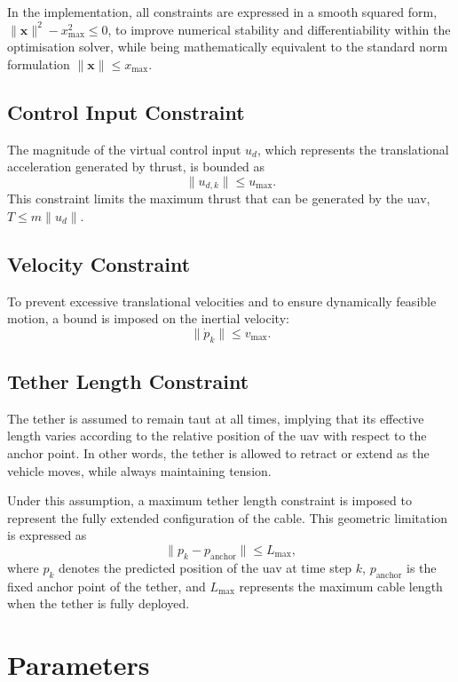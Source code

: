 In the implementation, all constraints are expressed in a smooth squared form, \(\|\mathbf{x}\|^2 - x_{\max}^2 \leq 0\), 
to improve numerical stability and differentiability within the optimisation solver, while being mathematically equivalent to the standard norm formulation \(\|\mathbf{x}\| \leq x_{\max}\).


\subsection{Control Input Constraint}

The magnitude of the virtual control input \(u_d\), which represents the translational acceleration generated by thrust, is bounded as
\[
\|u_{d,k}\| \le u_{\max}.
\]
This constraint limits the maximum thrust that can be generated by the \gls{uav}, \(T \leq m\|u_d\|\). 

\subsection{Velocity Constraint}

To prevent excessive translational velocities and to ensure dynamically feasible motion, a bound is imposed on the inertial velocity:
\[
\|\dot{p}_k\| \le v_{\max}.
\]


\subsection{Tether Length Constraint}

The tether is assumed to remain taut at all times, implying that its effective length varies according to the relative position of the \gls{uav} with respect to the anchor point. In other words, the tether is allowed to retract or extend as the vehicle moves, while always maintaining tension.

Under this assumption, a maximum tether length constraint is imposed to represent the fully extended configuration of the cable. This geometric limitation is expressed as
\[
\|p_k - p_{\text{anchor}}\| \le L_{\max},
\]
where \(p_k\) denotes the predicted position of the \gls{uav} at time step \(k\), \(p_{\text{anchor}}\) is the fixed anchor point of the tether, and \(L_{\max}\) represents the maximum cable length when the tether is fully deployed.




\section{Parameters}
\label{sec:parameters}

